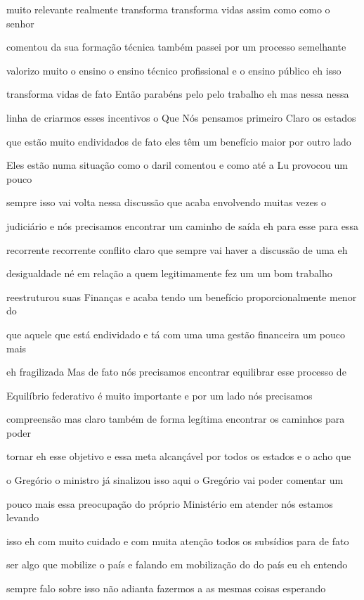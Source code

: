 \documentclass[a4paper,12pt]{article}
\begin{document}
muito relevante realmente transforma transforma vidas assim como como o senhor

comentou da sua formação técnica também passei por um processo semelhante

valorizo muito o ensino o ensino técnico profissional e o ensino público eh isso

transforma vidas de fato Então parabéns pelo pelo trabalho eh mas nessa nessa

linha de criarmos esses incentivos o Que Nós pensamos primeiro Claro os estados

que estão muito endividados de fato eles têm um benefício maior por outro lado

Eles estão numa situação como o daril comentou e como até a Lu provocou um pouco

sempre isso vai volta nessa discussão que acaba envolvendo muitas vezes o

judiciário e nós precisamos encontrar um caminho de saída eh para esse para essa

recorrente recorrente conflito claro que sempre vai haver a discussão de uma eh

desigualdade né em relação a quem legitimamente fez um um bom trabalho

reestruturou suas Finanças e acaba tendo um benefício proporcionalmente menor do

que aquele que está endividado e tá com uma uma gestão financeira um pouco mais

eh fragilizada Mas de fato nós precisamos encontrar equilibrar esse processo de

Equilíbrio federativo é muito importante e por um lado nós precisamos

compreensão mas claro também de forma legítima encontrar os caminhos para poder

tornar eh esse objetivo e essa meta alcançável por todos os estados e o acho que

o Gregório o ministro já sinalizou isso aqui o Gregório vai poder comentar um

pouco mais essa preocupação do próprio Ministério em atender nós estamos levando

isso eh com muito cuidado e com muita atenção todos os subsídios para de fato

ser algo que mobilize o país e falando em mobilização do do país eu eh entendo

sempre falo sobre isso não adianta fazermos a as mesmas coisas esperando
\end{document}
